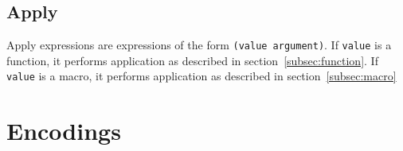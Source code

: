 \documentclass{article}
\newcommand{\comm}[1]{}
\begin{document}
\begin{multicols}{\comm{2}}
        \subsection{Apply}\label{subsec:apply}

        \begin{minipage}{\columnwidth}
            Apply expressions are expressions of the form \lstinline{(value argument)}.
            If \texttt{value} is a function, it performs application as described in section~\ref{subsec:function}.
            If \texttt{value} is a macro, it performs application as described in section~\ref{subsec:macro}
        \end{minipage}
    \end{multicols}
    \newpage

    \section{Encodings}\label{sec:encodings}

    \begin{multicols*}{\comm{2}}
        \begin{minipage}{\columnwidth}
            
        \end{minipage}
        \begin{minipage}{\columnwidth}
            
        \end{minipage}
        \begin{minipage}{\columnwidth}
            
        \end{minipage}
        \begin{minipage}{\columnwidth}
            
        \end{minipage}
        \begin{minipage}{\columnwidth}
            
        \end{minipage}
        \begin{minipage}{\columnwidth}
            
        \end{minipage}
        \begin{minipage}{\columnwidth}
            
        \end{minipage}
        \begin{minipage}{\columnwidth}
            
        \end{minipage}
    \end{multicols*}
    \newpage
\end{document}
